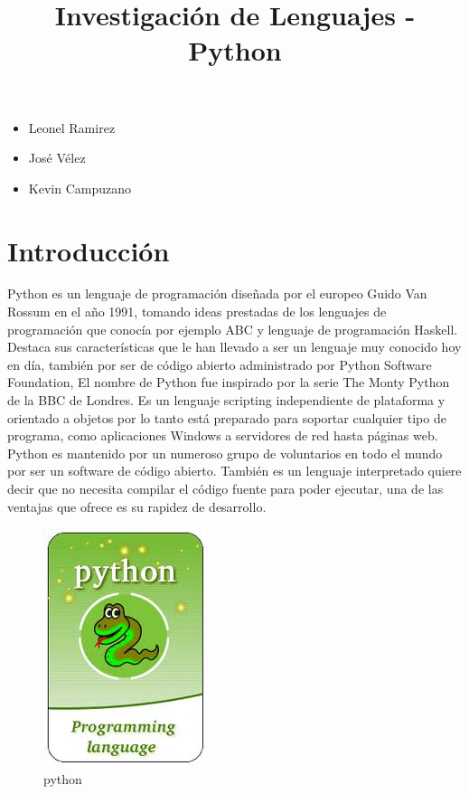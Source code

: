 \documentclass[11pt]{article} %
\title{Investigación de Lenguajes - Python}
\begin{document}
\maketitle
\begin{itemize}
\item Leonel Ramirez
\item José Vélez
\item Kevin Campuzano
\end{itemize}

\section{Introducción}
Python es un lenguaje de programación diseñada por el europeo Guido Van Rossum en el año 1991, tomando ideas prestadas de los lenguajes de programación que conocía por ejemplo ABC y lenguaje de programación Haskell.
Destaca sus características que le han llevado a ser un lenguaje muy conocido hoy en día, también por ser de código abierto administrado por Python Software Foundation, El nombre de Python fue inspirado por la serie The Monty Python de la BBC de Londres.
Es un lenguaje scripting independiente de plataforma y orientado a objetos  por lo tanto está preparado para soportar cualquier tipo de programa, como aplicaciones Windows a servidores de red hasta páginas web.
Python es mantenido por un numeroso grupo de voluntarios en todo el mundo por ser un software de código abierto.  También es un lenguaje interpretado quiere decir que no necesita compilar el código fuente para poder ejecutar, una de las ventajas que ofrece es su rapidez de desarrollo.
\begin{figure}[htbp]
\begin{center}
\includegraphics[width=.30\textwidth]{./imagenes/pythonXD.jpg}
\caption{python}
\label{qt}
\end{center}
\end{figure}
\end{document}
